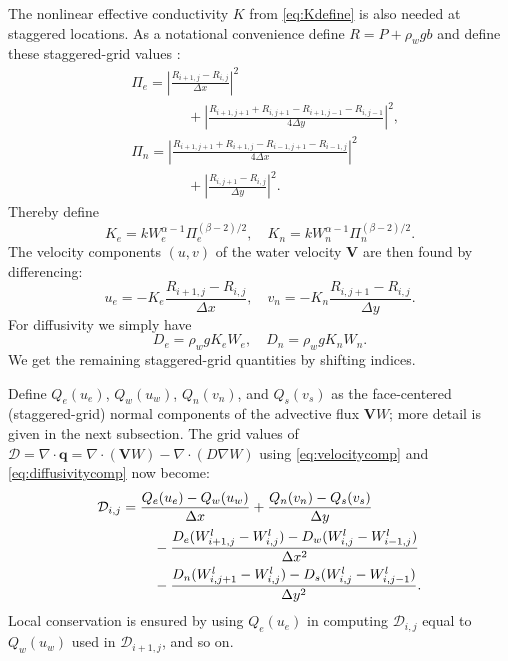 \documentclass[gmd]{copernicus}   %
\begin{document}
The nonlinear effective conductivity $K$ from \eqref{eq:Kdefine} is also needed at staggered locations.  As a notational convenience define $R=P+\rho_w g b$ and define these staggered-grid values \citep[compare][]{Mahaffy}:
\begin{align*}
&\Pi_e = \left|\frac{R_{i+1,j}-R_{i,j}}{\Delta x}\right|^2 \\
&\qquad \qquad + \left|\frac{R_{i+1,j+1}+R_{i,j+1} - R_{i+1,j-1}-R_{i,j-1}}{4\Delta y}\right|^2, \\
&\Pi_n = \left|\frac{R_{i+1,j+1}+R_{i+1,j} - R_{i-1,j+1}-R_{i-1,j}}{4\Delta x}\right|^2 \\
&\qquad \qquad + \left|\frac{R_{i,j+1}-R_{i,j}}{\Delta y}\right|^2.
\end{align*}
Thereby define
\begin{equation}
K_e = k W_e^{\alpha-1} \Pi_e^{(\beta-2)/2}, \quad K_n = k W_n^{\alpha-1} \Pi_n^{(\beta-2)/2}.  \label{eq:stagK}
\end{equation}
The velocity components $(u,v)$ of the water velocity $\mathbf{V}$ are then found by differencing:
\begin{equation}
u_e = - K_e \frac{R_{i+1,j}-R_{i,j}}{\Delta x}, \quad v_n = - K_n \frac{R_{i,j+1}-R_{i,j}}{\Delta y}.  \label{eq:velocitycomp}
\end{equation}
For diffusivity we simply have
\begin{equation}
D_e = \rho_w g K_e W_e, \quad D_n = \rho_w g K_n W_n.  \label{eq:diffusivitycomp}
\end{equation}
We get the remaining staggered-grid quantities by shifting indices.

Define $Q_e(u_e)$, $Q_w(u_w)$, $Q_n(v_n)$, and $Q_s(v_s)$ as the face-centered (staggered-grid) normal components of the advective flux $\mathbf{V} W$; more detail is given in the next subsection.  The grid values of $\mathcal{D} = \nabla\cdot \mathbf{q} = \nabla\cdot (\mathbf{V} W) - \nabla\cdot (D \nabla W)$ using \eqref{eq:velocitycomp} and \eqref{eq:diffusivitycomp} now become:
\begin{align}
&\mathcal{D}_{i,j} =  \frac{Q_e(u_e) - Q_w(u_w)}{\Delta x} + \frac{Q_n(v_n) - Q_s(v_s)}{\Delta y}  \label{eq:fluxdivgrid} \\
&\qquad \qquad - \frac{D_e (W_{i+1,j}^l - W^l_{i,j}) - D_w (W^l_{i,j} - W_{i-1,j}^l)}{\Delta x^2} \notag \\
&\qquad \qquad - \frac{D_n (W_{i,j+1}^l - W^l_{i,j}) - D_s (W^l_{i,j} - W_{i,j-1}^l)}{\Delta y^2}.  \notag
\end{align}
Local conservation is ensured by using $Q_e(u_e)$ in computing $\mathcal{D}_{i,j}$ equal to $Q_w(u_w)$ used in $\mathcal{D}_{i+1,j}$, and so on.
\end{document}
